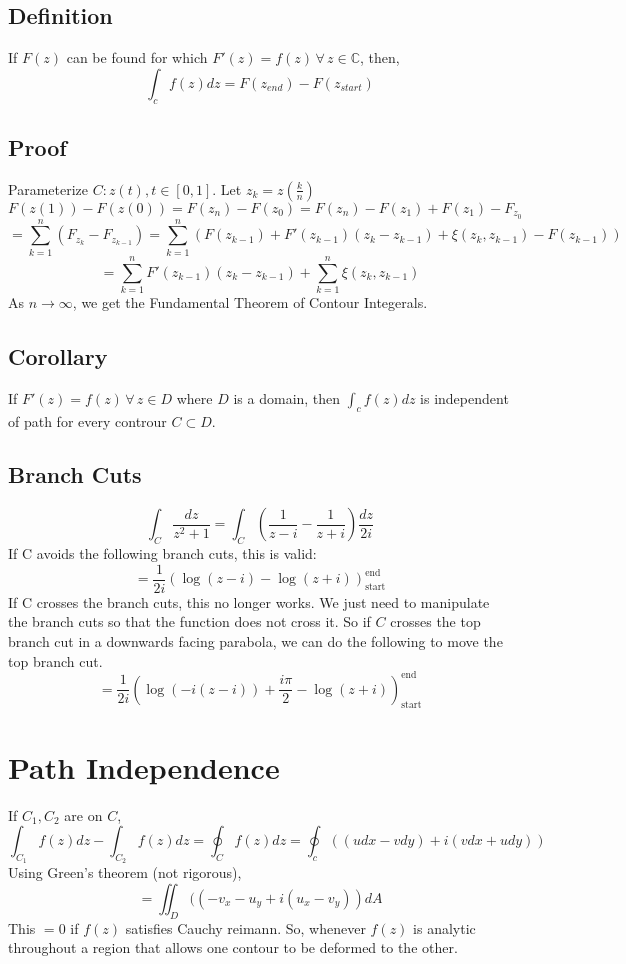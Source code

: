 \documentclass[../main.tex]{subfiles}
\begin{document}
\subsection{Definition}
If $F(z)$ can be found for which $F'(z)=f(z)\,\forall\, z\in \mathbb{C}$,
then, $$\int_{c}f(z)dz=F(z_{end})-F(z_{start})$$
\subsection{Proof}
Parameterize $C:z(t),t\in[0,1]$. Let $z_{k}=z\left(\frac{k}{n}\right)$
$$F(z(1))-F(z(0))=F(z_{n})-F(z_{0})=F(z_{n})-F(z_{1})+F(z_{1})-F_{z_{0}}$$
$$=\sum_{k=1}^{n}(F_{z_{k}}-F_{z_{k-1}})=\sum_{k=1}^{n}(F(z_{k-1})+F'(z_{k-1})(z_{k}-z_{k-1})+\xi(z_{k},z_{k-1})-F(z_{k-1}))$$
$$=\sum_{k=1}^{n}F'(z_{k-1})(z_{k}-z_{k-1})+\sum_{k=1}^{n}\xi(z_{k},z_{k-1})$$
As $n\rightarrow\infty$, we get the Fundamental Theorem of Contour Integerals.

\subsection{Corollary}
If $F'(z)=f(z)\,\forall\, z\in D$ where $D$ is a domain, then
$\int_{c}f(z)dz$ is independent of path for every controur $C\subset D$.
\subsection{Branch Cuts}
$$\int_{C}\frac{dz}{z^{2}+1}=\int_{C}\left(\frac{1}{z-i}-\frac{1}{z+i}\right)\frac{dz}{2i}$$
If C avoids the following branch cuts, this is valid:
$$=\frac{1}{2i}\left(\log (z-i)-\log (z+i)\right)_{\text{start}}^{\text{end}}$$
If C crosses the branch cuts, this no longer works. We just need to manipulate the branch cuts
so that the function does not cross it. So if $C$ crosses the top branch cut in a downwards facing parabola,
we can do the following to move the top branch cut.
$$=\frac{1}{2i}\left(\log (-i(z-i))+\frac{i\pi}{2}-\log (z+i)\right)_{\text{start}}^{\text{end}}$$

\section{Path Independence}
If $C_{1},C_{2}$ are on $C$,
$$\int_{C_{1}}f(z)dz-\int_{C_{2}}f(z)dz=\oint_{C}f(z)dz=\oint_{c}((udx-vdy)+i(vdx+udy))$$
Using Green's theorem (not rigorous),
$$=\iint_{D}((-v_{x}-u_{y}+i(u_{x}-v_{y}))dA$$
This $=0$ if $f(z)$ satisfies Cauchy reimann. So, whenever $f(z)$ is analytic throughout a region that allows
one contour to be deformed to the other.
\end{document}
